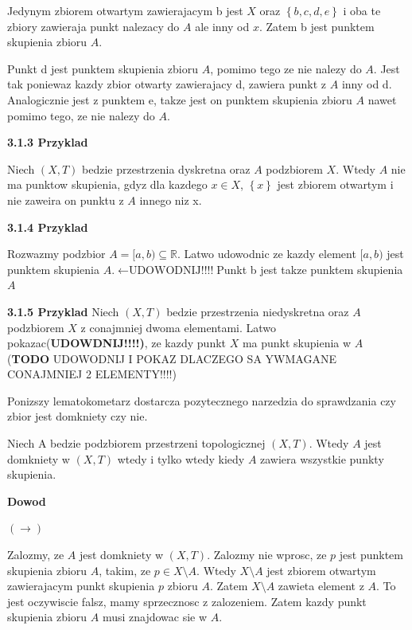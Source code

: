 \documentclass{article}
\begin{document}
Jedynym zbiorem otwartym zawierajacym b jest $X$ oraz $\left\{ b,c,d,e \right\}$ i oba te zbiory zawieraja punkt nalezacy do $A$ ale inny od $x$. Zatem b jest punktem skupienia zbioru $A$.

Punkt d jest punktem skupienia zbioru $A$, pomimo tego ze nie nalezy do $A$. Jest tak poniewaz kazdy zbior otwarty zawierajacy d, zawiera punkt z $A$ inny od d. Analogicznie jest z punktem e, takze jest on punktem skupienia zbioru $A$ nawet pomimo tego, ze nie nalezy do $A$.


\textbf{3.1.3 Przyklad}

Niech $(X, T)$ bedzie przestrzenia dyskretna oraz $A$ podzbiorem $X$. Wtedy $A$ nie ma punktow skupienia, gdyz dla kazdego $x \in X$, $\left\{ x \right\}$ jest zbiorem otwartym i nie zaweira on punktu z $A$ innego niz x.

\textbf{3.1.4 Przyklad}

Rozwazmy podzbior $A = [a,b) \subseteq \mathbb{R}$. Latwo udowodnic ze kazdy element $[a,b)$ jest punktem skupienia $A$.$\leftarrow \text{UDOWODNIJ!!!!} $Punkt b jest takze punktem skupienia $A$  

\textbf{3.1.5 Przyklad}
Niech $(X,T)$ bedzie przestrzenia niedyskretna oraz $A$ podzbiorem $X$ z conajmniej dwoma elementami. Latwo pokazac(\textbf{UDOWDNIJ!!!!)}, ze kazdy punkt $X$ ma punkt skupienia w $A$ (\textbf{TODO} UDOWODNIJ I POKAZ DLACZEGO SA YWMAGANE CONAJMNIEJ 2 ELEMENTY!!!!)

Ponizszy lematokometarz dostarcza pozytecznego narzedzia do sprawdzania czy zbior jest domkniety czy nie.

\begin{tcolorbox}[colback=white!90!green,colframe=black!35!green,title=3.1.6 Lematokomentarz: Warunek na domknietosc A]

    Niech A bedzie podzbiorem przestrzeni topologicznej $(X,T)$. Wtedy $A$ jest domkniety w $(X,T)$ wtedy i tylko wtedy kiedy $A$ zawiera wszystkie punkty skupienia.

\end{tcolorbox}

\textbf{Dowod}

$(\rightarrow)$

Zalozmy, ze $A$ jest domkniety w $(X,T)$. Zalozmy nie wprosc, ze $p$ jest punktem skupienia zbioru $A$, takim, ze $p \in X\setminus A$. Wtedy $X\setminus A$ jest zbiorem otwartym zawierajacym punkt skupienia $p$ zbioru $A$. Zatem $X\setminus A$ zawieta element z $A$. To jest oczywiscie falsz, mamy sprzecznosc z zalozeniem. Zatem kazdy punkt skupienia zbioru $A$ musi znajdowac sie w $A$.
\end{document}
